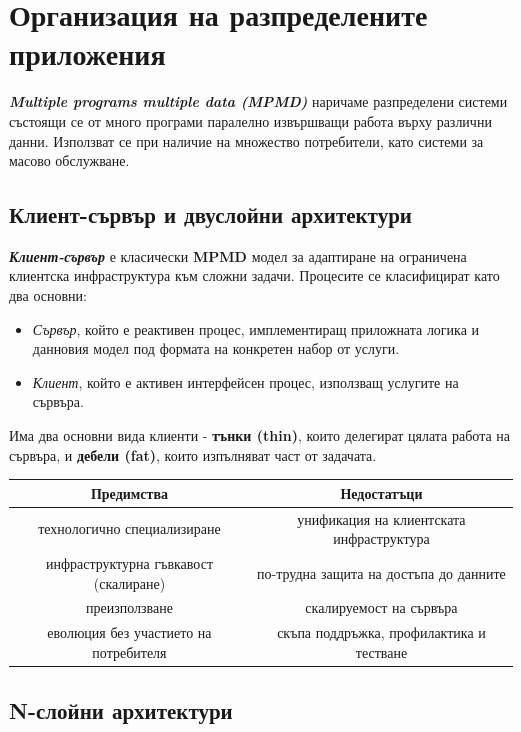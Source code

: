 \documentclass[fleqn,12pt]{article}
\begin{document}
\section{Организация на разпределените приложения}

\textbf{\textit{Multiple programs multiple data (MPMD)}} наричаме разпределени системи състоящи се от много програми паралелно извършващи работа върху различни данни.
Използват се при наличие на множество потребители, като системи за масово обслужване.

\subsection{Клиент-сървър и двуслойни архитектури}

\textbf{\textit{Клиент-сървър}} е класически \textbf{MPMD} модел за адаптиране на ограничена клиентска инфраструктура към сложни задачи.
Процесите се класифицират като два основни:
\begin{itemize}
    \item \textit{Сървър}, който е реактивен процес, имплементиращ приложната логика и данновия модел под формата на конкретен набор от услуги.
    \item \textit{Клиент}, който е активен интерфейсен процес, използващ услугите на сървъра.
\end{itemize}

Има два основни вида клиенти - \textbf{тънки (thin)}, които делегират цялата работа на сървъра, и \textbf{дебели (fat)}, които изпълняват част от задачата.
\bigbreak


\begin{center}
\begin{tabular}{ |c|c| } 
    \hline
    Предимства & Недостатъци \\
    \hline
    технологично специализиране & унификация на клиентската инфраструктура \\
    \hline
    инфраструктурна гъвкавост (скалиране) & по-трудна защита на достъпа до данните \\
    \hline
    преизползване & скалируемост на сървъра \\
    \hline
    еволюция без участието на потребителя & скъпа поддръжка, профилактика и тестване \\
    \hline
\end{tabular}
\end{center}

\subsection{N-слойни архитектури}
\end{document}
